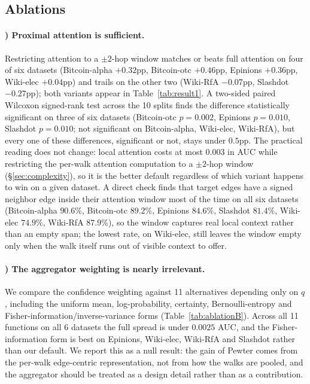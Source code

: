 \documentclass[sigconf]{acmart}
\newcounter{ablation}
\renewcommand{\theablation}{\Alph{ablation}}
\theoremstyle{plain}
\theoremstyle{definition}
\begin{document}
\subsection{Ablations}

\paragraph{\theablation) Proximal attention is sufficient.}
\label{abl:proximal}
Restricting attention to a $\pm2$-hop window matches or beats full attention on four of six datasets (Bitcoin-alpha $+0.32$pp, Bitcoin-otc $+0.46$pp, Epinions $+0.36$pp, Wiki-elec $+0.04$pp) and trails on the other two (Wiki-RfA $-0.07$pp, Slashdot $-0.27$pp); both variants appear in Table~\ref{tab:result1}. A two-sided paired Wilcoxon signed-rank test across the 10 splits finds the difference statistically significant on three of six datasets (Bitcoin-otc $p=0.002$, Epinions $p=0.010$, Slashdot $p=0.010$; not significant on Bitcoin-alpha, Wiki-elec, Wiki-RfA), but every one of these differences, significant or not, stays under $0.5$pp. The practical reading does not change: local attention costs at most 0.003 in AUC while restricting the per-walk attention computation to a $\pm2$-hop window (\S\ref{sec:complexity}), so it is the better default regardless of which variant happens to win on a given dataset. A direct check finds that target edges have a signed neighbor edge inside their attention window most of the time on all six datasets (Bitcoin-alpha $90.6\%$, Bitcoin-otc $89.2\%$, Epinions $84.6\%$, Slashdot $81.4\%$, Wiki-elec $74.9\%$, Wiki-RfA $87.9\%$), so the window captures real local context rather than an empty span; the lowest rate, on Wiki-elec, still leaves the window empty only when the walk itself runs out of visible context to offer.

\paragraph{\theablation) The aggregator weighting is nearly irrelevant.}
\label{abl:aggregator}
We compare the confidence weighting against 11 alternatives depending only on $q$, including the uniform mean, log-probability, certainty, Bernoulli-entropy and Fisher-information/inverse-variance forms (Table~\ref{tab:ablationB}). Across all 11 functions on all 6 datasets the full spread is under $0.0025$ AUC, and the Fisher-information form is best on Epinions, Wiki-elec, Wiki-RfA and Slashdot rather than our default. We report this as a null result: the gain of Pewter comes from the per-walk edge-centric representation, not from how the walks are pooled, and the aggregator should be treated as a design detail rather than as a contribution.
\end{document}
